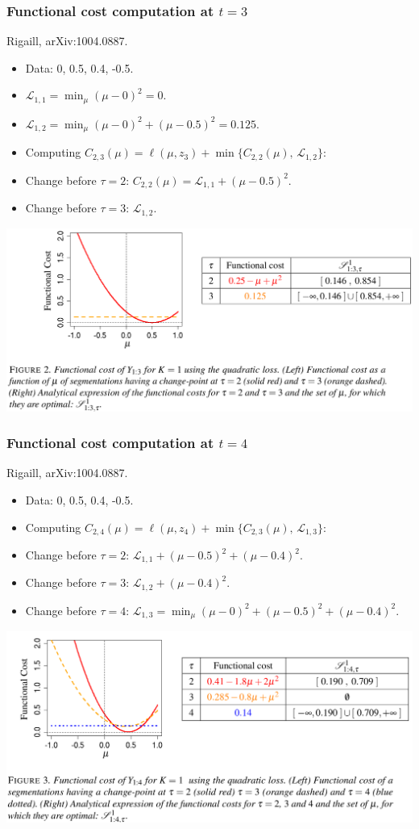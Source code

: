 \documentclass{beamer}
\begin{document}
\begin{frame}
  \frametitle{Functional cost computation at $t=3$}
  Rigaill, arXiv:1004.0887.

  \begin{itemize}
  \item Data: 0, 0.5, 0.4, -0.5. 
  \item $\mathcal L_{1,1}=\min_\mu (\mu-0)^2=0$.
  \item $\mathcal L_{1,2}=\min_\mu (\mu-0)^2 + (\mu-0.5)^2=0.125$.
  \item Computing
    $C_{2,3}(\mu) = \ell(\mu, z_3) + \min\{C_{2,2}(\mu),\, \mathcal
    L_{1,2}\}$:
  \item Change before $\tau=2$: $C_{2,2}(\mu)=\mathcal L_{1,1} + (\mu-0.5)^2$.
  \item Change before $\tau=3$: $\mathcal L_{1,2}$.
  \end{itemize}

  \includegraphics[width=\textwidth]{screenshot-figure-2}
\end{frame}

\begin{frame}
  \frametitle{Functional cost computation at $t=4$}
  Rigaill, arXiv:1004.0887.

  \begin{itemize}
  \item Data: 0, 0.5, 0.4, -0.5. 
  \item Computing $C_{2,4}(\mu) = \ell(\mu, z_4) + \min\{C_{2,3}(\mu),\, \mathcal
    L_{1,3}\}$:
  \item Change before $\tau=2$: $\mathcal L_{1,1} + (\mu-0.5)^2+(\mu-0.4)^2$.
  \item Change before $\tau=3$: $\mathcal L_{1,2}+(\mu-0.4)^2$.
  \item Change before $\tau=4$: $\mathcal L_{1,3}=\min_\mu (\mu-0)^2+(\mu-0.5)^2+(\mu-0.4)^2$.
  \end{itemize}

  \includegraphics[width=\textwidth]{screenshot-figure-3}
\end{frame}
\end{document}
